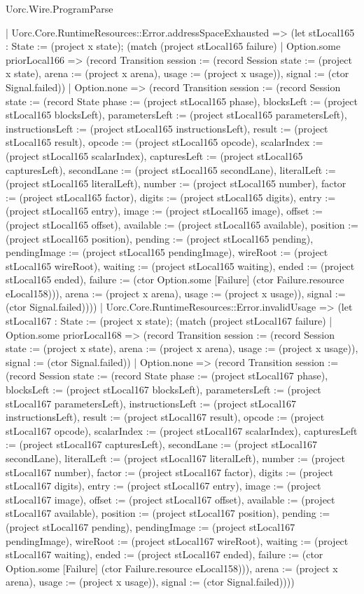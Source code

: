 \begin{lexlean}{Uorc.Wire.ProgramParse}
\begin{semanticmodule}
{      | Uorc.Core.RuntimeResources::Error.addressSpaceExhausted => (let stLocal165 : State := (project x state); (match (project stLocal165 failure)
        | Option.some priorLocal166 => (record Transition {session := (record Session {state := (project x state), arena := (project x arena), usage := (project x usage)}), signal := (ctor Signal.failed)})
        | Option.none => (record Transition {session := (record Session {state := (record State {phase := (project stLocal165 phase), blocksLeft := (project stLocal165 blocksLeft), parametersLeft := (project stLocal165 parametersLeft), instructionsLeft := (project stLocal165 instructionsLeft), result := (project stLocal165 result), opcode := (project stLocal165 opcode), scalarIndex := (project stLocal165 scalarIndex), capturesLeft := (project stLocal165 capturesLeft), secondLane := (project stLocal165 secondLane), literalLeft := (project stLocal165 literalLeft), number := (project stLocal165 number), factor := (project stLocal165 factor), digits := (project stLocal165 digits), entry := (project stLocal165 entry), image := (project stLocal165 image), offset := (project stLocal165 offset), available := (project stLocal165 available), position := (project stLocal165 position), pending := (project stLocal165 pending), pendingImage := (project stLocal165 pendingImage), wireRoot := (project stLocal165 wireRoot), waiting := (project stLocal165 waiting), ended := (project stLocal165 ended), failure := (ctor Option.some [Failure] (ctor Failure.resource eLocal158))}), arena := (project x arena), usage := (project x usage)}), signal := (ctor Signal.failed)})))
      | Uorc.Core.RuntimeResources::Error.invalidUsage => (let stLocal167 : State := (project x state); (match (project stLocal167 failure)
        | Option.some priorLocal168 => (record Transition {session := (record Session {state := (project x state), arena := (project x arena), usage := (project x usage)}), signal := (ctor Signal.failed)})
        | Option.none => (record Transition {session := (record Session {state := (record State {phase := (project stLocal167 phase), blocksLeft := (project stLocal167 blocksLeft), parametersLeft := (project stLocal167 parametersLeft), instructionsLeft := (project stLocal167 instructionsLeft), result := (project stLocal167 result), opcode := (project stLocal167 opcode), scalarIndex := (project stLocal167 scalarIndex), capturesLeft := (project stLocal167 capturesLeft), secondLane := (project stLocal167 secondLane), literalLeft := (project stLocal167 literalLeft), number := (project stLocal167 number), factor := (project stLocal167 factor), digits := (project stLocal167 digits), entry := (project stLocal167 entry), image := (project stLocal167 image), offset := (project stLocal167 offset), available := (project stLocal167 available), position := (project stLocal167 position), pending := (project stLocal167 pending), pendingImage := (project stLocal167 pendingImage), wireRoot := (project stLocal167 wireRoot), waiting := (project stLocal167 waiting), ended := (project stLocal167 ended), failure := (ctor Option.some [Failure] (ctor Failure.resource eLocal158))}), arena := (project x arena), usage := (project x usage)}), signal := (ctor Signal.failed)})))
}
\end{semanticmodule}
\end{lexlean}
